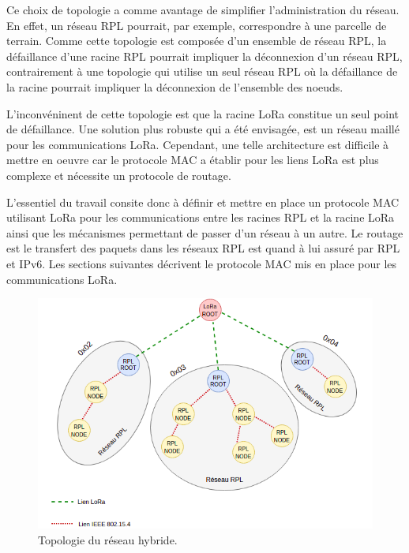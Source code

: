 Ce choix de topologie a comme avantage de simplifier l'administration du réseau. En effet, un réseau RPL pourrait, par exemple, correspondre à une parcelle de terrain. Comme cette topologie est composée d'un ensemble de réseau RPL, la défaillance d'une racine RPL pourrait impliquer la déconnexion d'un réseau RPL, contrairement à une topologie qui utilise un seul réseau RPL où la défaillance de la racine pourrait impliquer la déconnexion de l'ensemble des noeuds.

L'inconvéninent de cette topologie est que la racine LoRa constitue un seul point de défaillance. Une solution plus robuste qui a été envisagée, est un réseau maillé pour les communications LoRa. Cependant, une telle architecture est difficile à mettre en oeuvre car le protocole MAC a établir pour les liens LoRa est plus complexe et nécessite un protocole de routage.

L'essentiel du travail consite donc à définir et mettre en place un protocole MAC utilisant LoRa pour les communications entre les racines RPL et la racine LoRa ainsi que les mécanismes permettant de passer d'un réseau à un autre. Le routage est le transfert des paquets dans les réseaux RPL est quand à lui assuré par RPL et IPv6. Les sections suivantes décrivent le protocole MAC mis en place pour les communications LoRa.

\begin{figure}[H]
    \centering
    \includegraphics[scale=0.5]{res/pictures/loramac-topologie.drawio.png}
    \caption{Topologie du réseau hybride.}
    \label{fig:archi-topologie}
\end{figure}

